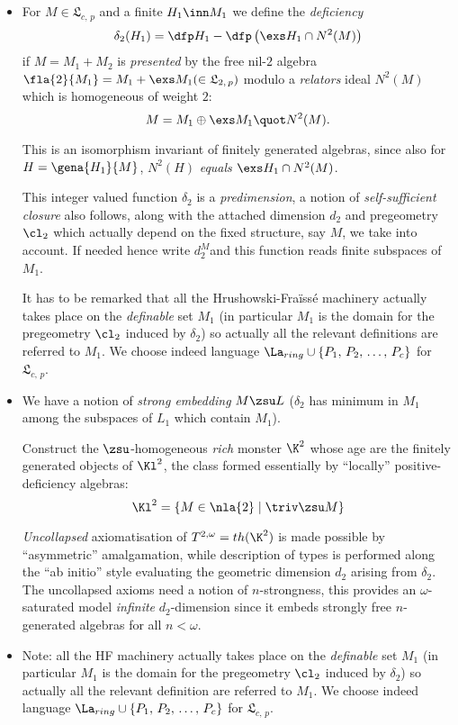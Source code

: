 \documentclass[a4paper,11pt,german,english]{report}
\newcommand{\nl}[1]{\mathfrak{L}_{#1,\,p}}
\begin{document}
\begin{itemize}
\item[]%
For $M\in\mathfrak{L}_{c,\,p}$ and a finite $H_{1}\inn M_{1}$ we define the {\em deficiency}
$$\delta_{2}(H_{1})=\dfp H_{1}-\dfp\left(
\exs H_{1}\cap N^{2}(M)\right)$$
if $M=M_{1}+M_{2}$ is {\em presented} by the free nil-$2$
algebra $\fla{2}{M_{1}}=M_{1}+\exs M_{1}(\in\mathfrak{L}_{2,\,p})$ modulo a {\em relators} ideal $N^{2}(M)$
which is homogeneous of weight $2$:
$$M=M_{1}\oplus\exs M_{1}\quot N^{2}(M).$$


This is an isomorphism invariant of finitely generated algebras, since also
for $H=\gena{H_{1}}{M}$, $N^{2}(H)$ {\em equals} $\exs H_{1}\cap N^{2}(M)$.

This integer valued function $\delta_{2}$ is a {\em predimension}, a notion of {\em self-sufficient
closure} also follows, along with the attached dimension $d_{2}$ and pregeometry $\cl_{2}$ which actually
depend on the fixed structure, say $M$, we take into account. If needed hence write $d_{2}^{M}$and this
function reads finite subspaces of $M_{1}$. 

It has to be remarked that all the Hrushowski-Fra\"iss\'e machinery actually takes place on the {\em definable} set $M_{1}$
(in particular $M_{1}$ is the domain for the pregeometry $\cl_{2}$ induced by $\delta_{2}$)
so actually all the relevant definitions are referred to $M_{1}$. We choose indeed language
$\La_{ring}%
\cup\{P_{1},\,P_{2},\,\dots,\,P_{c}\}$ for $\nl{c}$.
\item[]We have a notion of {\em strong embedding} $M\zsu L$ ($\delta_{2}$ has minimum
in $M_{1}$ among the subspaces of $L_{1}$ which contain $M_{1}$).

Construct the $\zsu$-homogeneous {\em rich} monster $\K^{2}$ whose age are the finitely generated objects of $\Kl^{2}$, the class formed essentially by ``locally'' positive-deficiency algebras:
$$\Kl^{2}=\{M\in\nla{2}\mid \triv\zsu M\}$$

{\em Uncollapsed} axiomatisation of $T^{2,\omega}=th(\K^{2})$ is made possible by ``asymmetric'' amalgamation, while
description of types is performed along the ``ab initio'' style evaluating the geometric
dimension $d_{2}$ arising from $\delta_{2}$. The uncollapsed axioms need a notion
of $n$-strongness, this provides an $\omega$-saturated model {\em infinite}
$d_{2}$-dimension since it embeds strongly free $n$-generated algebras for
all $n<\omega$.

\item[]Note: all the HF machinery actually takes place on the {\em definable} set $M_{1}$
(in particular $M_{1}$ is the domain for the pregeometry $\cl_{2}$ induced by $\delta_{2}$)
so actually all the relevant definition are referred to $M_{1}$. We choose indeed language
$\La_{ring}%
\cup\{P_{1},\,P_{2},\,\dots,\,P_{c}\}$ for $\nl{c}$.
\end{itemize}
\end{document}
